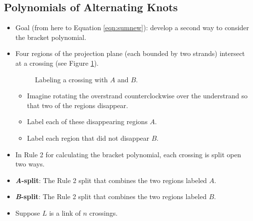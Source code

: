 \documentclass[titlepage]{article}
\numberwithin{figure}{section}
\numberwithin{table}{section}
\numberwithin{equation}{section}
\begin{document}
\subsection{Polynomials of Alternating Knots}
\begin{itemize}
    \item Goal (from here to Equation \ref{eqn:sumnew}): develop a second way to consider the bracket polynomial.
    \item Four regions of the projection plane (each bounded by two strands) intersect at a crossing (see Figure \ref{fig:ABAB}).
    \begin{figure}[h!]
        \centering
        \caption{Labeling a crossing with $A$ and $B$.}
        \label{fig:ABAB}
    \end{figure}
    \begin{itemize}
        \item Imagine rotating the overstrand counterclockwise over the understrand so that two of the regions disappear.
        \item Label each of these disappearing regions $A$.
        \item Label each region that did not disappear $B$.
    \end{itemize}
    \item In Rule 2 for calculating the bracket polynomial, each crossing is split open two ways.
    \item \textbf{\emph{A}-split}: The Rule 2 split that combines the two regions labeled $A$.
    \item \textbf{\emph{B}-split}: The Rule 2 split that combines the two regions labeled $B$.
    \item Suppose $L$ is a link of $n$ crossings.

\end{itemize}
\end{document}
